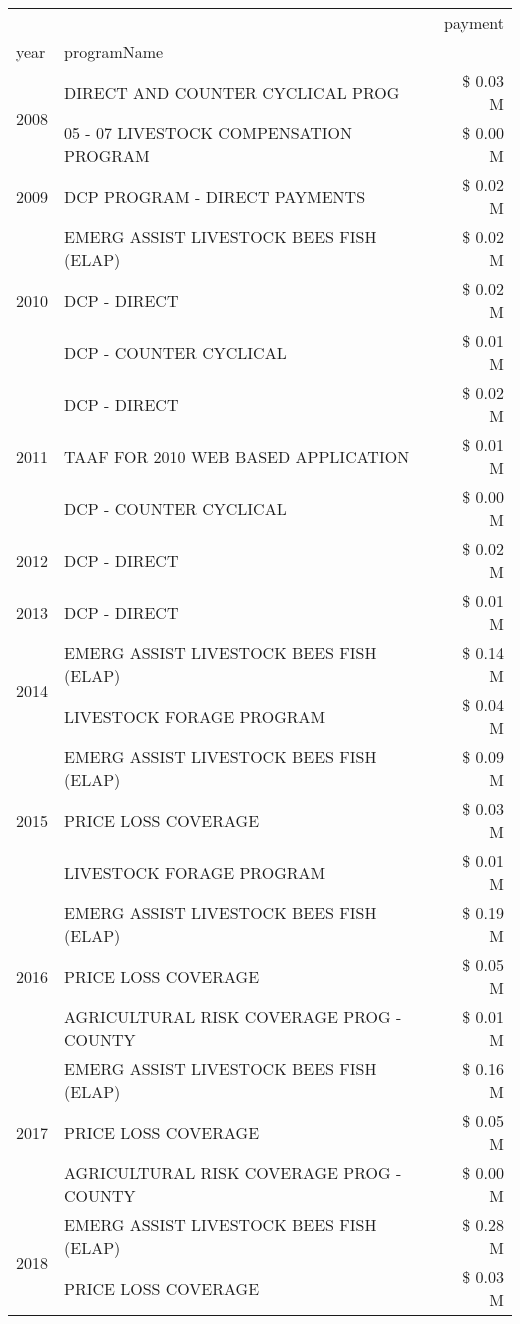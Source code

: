\begin{tabular}{llr}
\toprule
 &  & payment \\
year & programName &  \\
\midrule
\multirow[t]{2}{*}{2008} & DIRECT AND COUNTER CYCLICAL PROG & \$ 0.03 M \\
 & 05 - 07 LIVESTOCK COMPENSATION PROGRAM & \$ 0.00 M \\
\cline{1-3}
2009 & DCP PROGRAM - DIRECT PAYMENTS & \$ 0.02 M \\
\cline{1-3}
\multirow[t]{3}{*}{2010} & EMERG ASSIST LIVESTOCK BEES FISH (ELAP) & \$ 0.02 M \\
 & DCP - DIRECT & \$ 0.02 M \\
 & DCP - COUNTER CYCLICAL & \$ 0.01 M \\
\cline{1-3}
\multirow[t]{3}{*}{2011} & DCP - DIRECT & \$ 0.02 M \\
 & TAAF FOR 2010 WEB BASED APPLICATION & \$ 0.01 M \\
 & DCP - COUNTER CYCLICAL & \$ 0.00 M \\
\cline{1-3}
2012 & DCP - DIRECT & \$ 0.02 M \\
\cline{1-3}
2013 & DCP - DIRECT & \$ 0.01 M \\
\cline{1-3}
\multirow[t]{2}{*}{2014} & EMERG ASSIST LIVESTOCK BEES FISH (ELAP) & \$ 0.14 M \\
 & LIVESTOCK FORAGE PROGRAM & \$ 0.04 M \\
\cline{1-3}
\multirow[t]{3}{*}{2015} & EMERG ASSIST LIVESTOCK BEES FISH (ELAP) & \$ 0.09 M \\
 & PRICE LOSS COVERAGE & \$ 0.03 M \\
 & LIVESTOCK FORAGE PROGRAM & \$ 0.01 M \\
\cline{1-3}
\multirow[t]{3}{*}{2016} & EMERG ASSIST LIVESTOCK BEES FISH (ELAP) & \$ 0.19 M \\
 & PRICE LOSS COVERAGE & \$ 0.05 M \\
 & AGRICULTURAL RISK COVERAGE PROG - COUNTY & \$ 0.01 M \\
\cline{1-3}
\multirow[t]{3}{*}{2017} & EMERG ASSIST LIVESTOCK BEES FISH (ELAP) & \$ 0.16 M \\
 & PRICE LOSS COVERAGE & \$ 0.05 M \\
 & AGRICULTURAL RISK COVERAGE PROG - COUNTY & \$ 0.00 M \\
\cline{1-3}
\multirow[t]{3}{*}{2018} & EMERG ASSIST LIVESTOCK BEES FISH (ELAP) & \$ 0.28 M \\
 & PRICE LOSS COVERAGE & \$ 0.03 M \\

\end{tabular}
